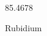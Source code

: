 \documentclass[12pt]{article}
\begin{document}
\hfill{}
\vfill
\begin{center}
  {\fontsize{50}{60}
  }

  \vspace{1em}

  85.4678

Rubidium
\end{center}
\vfill
\end{document}
